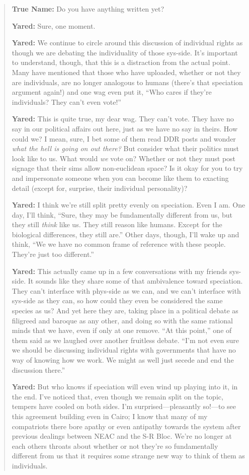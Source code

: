 \begin{quote}
\textbf{True Name:} Do you have anything written yet?

\textbf{Yared:} Sure, one moment.

\textbf{Yared:} We continue to circle around this discussion of individual rights as though we are debating the individuality of those sys-side. It's important to understand, though, that this is a distraction from the actual point. Many have mentioned that those who have uploaded, whether or not they are individuals, are no longer analogous to humans (there's that speciation argument again!) and one wag even put it, ``Who cares if they're individuals? They can't even vote!''

\textbf{Yared:} This is quite true, my dear wag. They can't vote. They have no say in our political affairs out here, just as we have no say in theirs. How could we? I mean, sure, I bet some of them read DDR posts and wonder \emph{what the hell is going on out there?} But consider what their politics must look like to us. What would \emph{we} vote on? Whether or not they must post signage that their sims allow non-euclidean space? Is it okay for you to try and impersonate someone when you can become like them to exacting detail (except for, surprise, their individual personality)?

\textbf{Yared:} I think we're still split pretty evenly on speciation. Even I am. One day, I'll think, ``Sure, they may be fundamentally different from us, but they still \emph{think} like us. They still reason like humans. Except for the biological differences, they still are.'' Other days, though, I'll wake up and think, ``We we have no common frame of reference with these people. They're just too different.''

\textbf{Yared:} This actually came up in a few conversations with my friends sys-side. It sounds like they share some of that ambivalence toward speciation. They can't interface with phys-side as we can, and we can't interface with sys-side as they can, so how could they even be considered the same species as us? And yet here they are, taking place in a political debate as filigreed and baroque as any other, and doing so with the same rational minds that we have, even if only at one remove. ``At this point,'' one of them said as we laughed over another fruitless debate. ``I'm not even sure we should be discussing individual rights with governments that have no way of knowing how we work. We might as well just secede and end the discussion there.''

\textbf{Yared:} But who knows if speciation will even wind up playing into it, in the end. I've noticed that, even though we remain split on the topic, tempers have cooled on both sides. I'm surprised---pleasantly so!---to see this agreement building even in Cairo; I know that many of my compatriots there bore apathy or even antipathy towards the system after previous dealings between NEAC and the S-R Bloc. We're no longer at each others throats about whether or not they're so fundamentally different from us that it requires some strange new way to think of them as individuals.


\end{quote}
